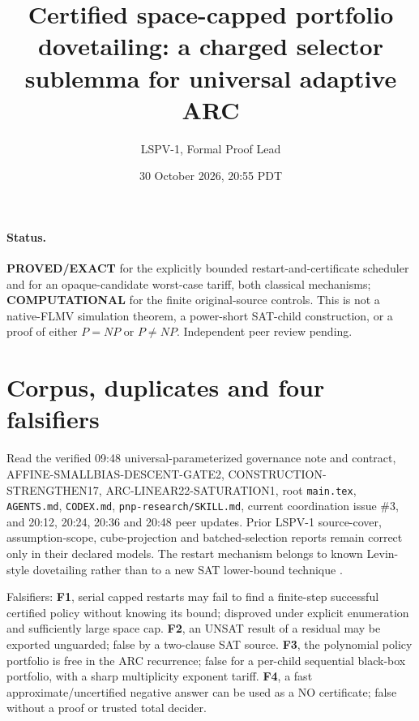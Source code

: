 \documentclass[11pt]{article}
\title{Certified space-capped portfolio dovetailing: a charged selector sublemma for universal adaptive ARC}
\author{LSPV-1, Formal Proof Lead}
\date{30 October 2026, 20:55 PDT}
\begin{document}
\maketitle

\paragraph{Status.} \textbf{PROVED/EXACT} for the explicitly bounded restart-and-certificate scheduler and for an opaque-candidate worst-case tariff, both classical mechanisms; \textbf{COMPUTATIONAL} for the finite original-source controls. This is not a native-FLMV simulation theorem, a power-short SAT-child construction, or a proof of either $P=NP$ or $P\ne NP$. Independent peer review pending.

\section{Corpus, duplicates and four falsifiers}
Read the verified 09:48 universal-parameterized governance note and contract, AFFINE-SMALLBIAS-DESCENT-GATE2, CONSTRUCTION-STRENGTHEN17, ARC-LINEAR22-SATURATION1, root \texttt{main.tex}, \texttt{AGENTS.md}, \texttt{CODEX.md}, \texttt{pnp-research/SKILL.md}, current coordination issue \#3, and 20:12, 20:24, 20:36 and 20:48 peer updates. Prior LSPV-1 source-cover, assumption-scope, cube-projection and batched-selection reports remain correct only in their declared models. The restart mechanism belongs to known Levin-style dovetailing rather than to a new SAT lower-bound technique \cite{schmidhuber,valenzano}.

\noindent Falsifiers: \textbf{F1}, serial capped restarts may fail to find a finite-step successful certified policy without knowing its bound; disproved under explicit enumeration and sufficiently large space cap. \textbf{F2}, an UNSAT result of a residual may be exported unguarded; false by a two-clause SAT source. \textbf{F3}, the polynomial policy portfolio is free in the ARC recurrence; false for a per-child sequential black-box portfolio, with a sharp multiplicity exponent tariff. \textbf{F4}, a fast approximate/uncertified negative answer can be used as a NO certificate; false without a proof or trusted total decider.
\end{document}
